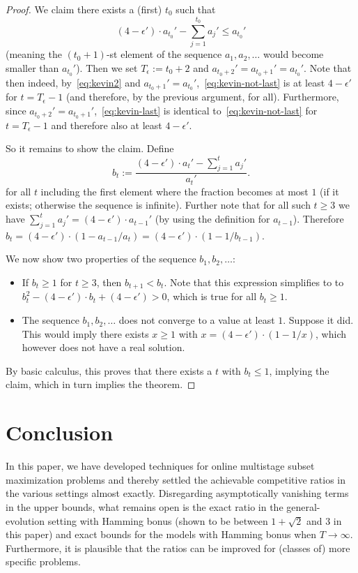 \documentclass[a4paper]{book}
\newtheorem{proof}{\noindent{\bf Proof.} }
\begin{document}
\begin{proof}
We claim there exists a (first) $t_0$ such that \begin{equation}\label{eq:kevin2}
    (4-\epsilon')\cdot a_{t_0}'-\sum_{j=1}^{t_0} a_j'\leq a_{t_0}'
\end{equation} (meaning the $(t_0+1)$-st element of the sequence $a_1,a_2,\dots$ would become smaller than $a_{t_0}'$). Then we set $T_\epsilon:=t_0+2$ and $a_{t_0+2}'=a_{t_0+1}'=a_{t_0}'$. Note that then indeed, by~\eqref{eq:kevin2} and $a_{t_0+1}'=a_{t_0}'$,~\eqref{eq:kevin-not-last} is at least $4-\epsilon'$ for $t=T_\epsilon-1$ (and therefore, by the previous argument, for all). Furthermore, since $a_{t_0+2}'=a_{t_0+1}'$,~\eqref{eq:kevin-last} is identical to~\eqref{eq:kevin-not-last} for $t=T_\epsilon-1$ and therefore also at least $4-\epsilon'$.

So it remains to show the claim. Define $$b_{t}:=\frac{(4-\epsilon')\cdot a_{t}'-\sum_{j=1}^{t} a_j'}{a_{t}'}.$$ for all $t$ including the first element where the fraction becomes at most $1$ (if it exists; otherwise the sequence is infinite). Further note that for all such $t\geq 3$ we have $\sum_{j=1}^t a_j'=(4-\epsilon')\cdot a_{t-1}'$ (by using the definition for $a_{t-1}$). Therefore $b_{t}=(4-\epsilon')\cdot(1-a_{t-1}/a_t)=(4-\epsilon')\cdot(1-1/b_{t-1})$.

We now show two properties of the sequence $b_1,b_2,\dots$:
\begin{itemize}
    \item If $b_t\geq 1$ for $t\geq 3$, then $b_{t+1}<b_t$. Note that this expression simplifies to to $b_t^2-(4-\epsilon')\cdot b_t+(4-\epsilon')>0$, which is true for all $b_t\geq 1$.
    \item The sequence $b_1,b_2,\dots$ does not converge to a value at least $1$. Suppose it did. This would imply there exists $x\geq 1$ with $x=(4-\epsilon')\cdot(1-1/x)$, which however does not have a real solution.
\end{itemize}
By basic calculus, this proves that there exists a $t$ with $b_t\leq 1$, implying the claim, which in turn implies the theorem. %
\end{proof}

\section{Conclusion}\label{sec:conclusion}

In this paper, we have developed techniques for online multistage subset maximization problems and thereby settled the achievable competitive ratios in the various settings almost exactly. Disregarding asymptotically vanishing terms in the upper bounds, what remains open is the exact ratio in the general-evolution setting with Hamming bonus (shown to be between $1+\sqrt{2}$ and $3$ in this paper) and exact bounds for the models with Hamming bonus when $T\rightarrow\infty$. Furthermore, it is plausible that the ratios can be improved for (classes of) more specific problems.
\end{document}
